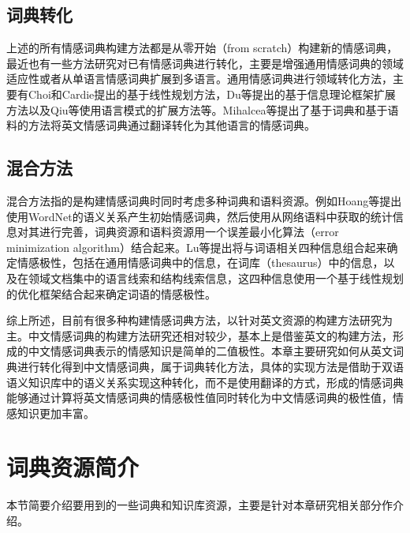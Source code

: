 \subsection{词典转化}
上述的所有情感词典构建方法都是从零开始（from scratch）构建新的情感词典，最近也有一些方法研究对已有情感词典进行转化，主要是增强通用情感词典的领域适应性或者从单语言情感词典扩展到多语言。通用情感词典进行领域转化方法，主要有Choi和Cardie提出的基于线性规划方法，Du等提出的基于信息理论框架扩展方法以及Qiu等使用语言模式的扩展方法等。Mihalcea等提出了基于词典和基于语料的方法将英文情感词典通过翻译转化为其他语言的情感词典。

\subsection{混合方法}
混合方法指的是构建情感词典时同时考虑多种词典和语料资源。例如Hoang等提出使用WordNet的语义关系产生初始情感词典，然后使用从网络语料中获取的统计信息对其进行完善，词典资源和语料资源用一个误差最小化算法（error minimization algorithm）结合起来。Lu等提出将与词语相关四种信息组合起来确定情感极性，包括在通用情感词典中的信息，在词库（thesaurus）中的信息，以及在领域文档集中的语言线索和结构线索信息，这四种信息使用一个基于线性规划的优化框架结合起来确定词语的情感极性。

综上所述，目前有很多种构建情感词典方法，以针对英文资源的构建方法研究为主。中文情感词典的构建方法研究还相对较少，基本上是借鉴英文的构建方法，形成的中文情感词典表示的情感知识是简单的二值极性。本章主要研究如何从英文词典进行转化得到中文情感词典，属于词典转化方法，具体的实现方法是借助于双语语义知识库中的语义关系实现这种转化，而不是使用翻译的方式，形成的情感词典能够通过计算将英文情感词典的情感极性值同时转化为中文情感词典的极性值，情感知识更加丰富。



\section{词典资源简介}
\label{ch2:lex}
本节简要介绍要用到的一些词典和知识库资源，主要是针对本章研究相关部分作介绍。
